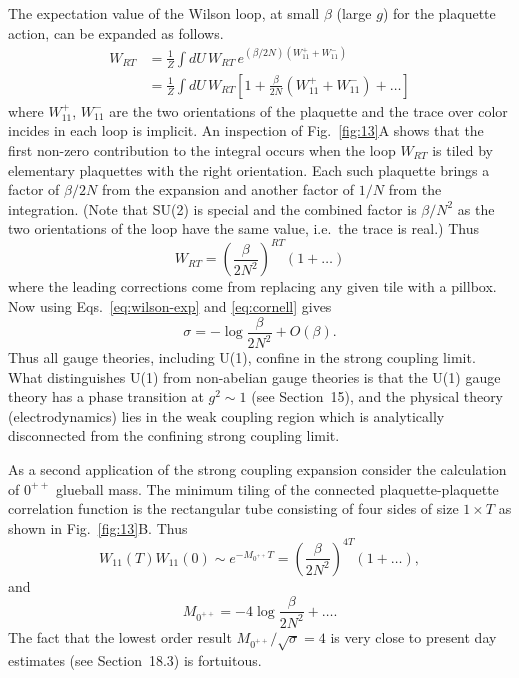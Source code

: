 The expectation value of the Wilson loop, at small $\beta$ (large $g$) for
the plaquette action, can be expanded as follows.
\begin{equation}
  \begin{aligned}
    W_{RT} &= \frac{1}{Z}\int dU\, W_{RT}\,
      e^{(\beta/2N)(W_{11}^{+}+W_{11}^{-})} \\
    &= \frac{1}{Z}\int dU\, W_{RT}\left[1 + \frac{\beta}{2N}\left(W_{11}^{+}
      + W_{11}^{-}\right) + \ldots\right]
  \end{aligned}
  \label{eq:W-expansion}
\end{equation}
where $W_{11}^{+}$, $W_{11}^{-}$ are the two orientations of the plaquette
and the trace over color incides in each loop is implicit. An inspection of
Fig.~\ref{fig:13}A shows that the first non-zero contribution to the
integral occurs when the loop $W_{RT}$ is tiled by elementary plaquettes
with the right orientation. Each such plaquette brings a factor of
$\beta/2N$ from the expansion and another factor of $1/N$ from the
integration. (Note that SU(2) is special and the combined factor is
$\beta/N^2$ as the two orientations of the loop have the same value, i.e.\
the trace is real.) Thus
\begin{equation}
  W_{RT} = \left(\frac{\beta}{2N^2}\right)^{RT}\left(1 + \ldots\right)
  \label{eq:W-area}
\end{equation}
where the leading corrections come from replacing any given tile with a
pillbox. Now using Eqs.~\eqref{eq:wilson-exp} and \eqref{eq:cornell} gives
\begin{equation}
  \sigma = -\log\frac{\beta}{2N^2} + O(\beta).
  \label{eq:sigma-sc}
\end{equation}
Thus all gauge theories, including U(1), confine in the strong coupling
limit. What distinguishes U(1) from non-abelian gauge theories is that the
U(1) gauge theory has a phase transition at $g^2 \sim 1$ (see
Section~15), and the physical theory
(electrodynamics) lies in the weak coupling region which is analytically
disconnected from the confining strong coupling limit.

As a second application of the strong coupling expansion consider the
calculation of $0^{++}$ glueball mass. The minimum tiling of the connected
plaquette-plaquette correlation function is the rectangular tube consisting
of four sides of size $1 \times T$ as shown in Fig.~\ref{fig:13}B. Thus
\begin{equation}
  W_{11}(T)W_{11}(0) \sim e^{-M_{0^{++}}T}
    = \left(\frac{\beta}{2N^2}\right)^{4T}\left(1 + \ldots\right),
  \label{eq:glueball}
\end{equation}
and
\begin{equation}
  M_{0^{++}} = -4\log\frac{\beta}{2N^2} + \ldots .
  \label{eq:Mglueball}
\end{equation}
The fact that the lowest order result $M_{0^{++}}/\sqrt{\sigma} = 4$ is very
close to present day estimates (see Section~18.3) is fortuitous.

